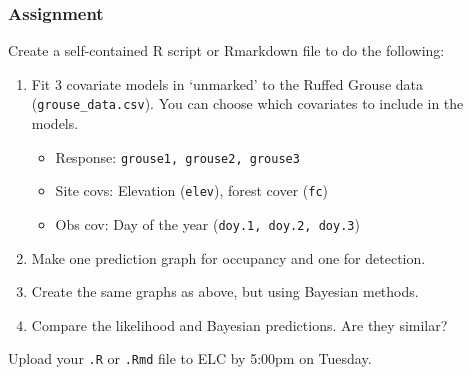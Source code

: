 \documentclass[color=usenames,dvipsnames]{beamer}\usepackage[]{graphicx}\usepackage[]{xcolor}
\begin{document}
\begin{frame}
  \frametitle{Assignment}
  \footnotesize
  Create a self-contained R script or Rmarkdown file
  to do the following:
  \vfill
  \begin{enumerate}
    \footnotesize
    \item Fit 3 covariate models in `unmarked' to the Ruffed Grouse
      data ({\tt grouse\_data.csv}). You can choose which covariates
      to include in the models.  
      \begin{itemize}
        \footnotesize
        \item Response: \texttt{grouse1, grouse2, grouse3}
        \item Site covs: Elevation (\texttt{elev}), forest cover ({\tt fc})
        \item Obs cov: Day of the year (\texttt{doy.1, doy.2, doy.3})
      \end{itemize}
    \item Make one prediction graph for occupancy and one for
      detection.  
    \item Create the same graphs as above, but using Bayesian methods.
    \item Compare the likelihood and Bayesian predictions. Are they
      similar?   
    \end{enumerate}
    \vfill
    Upload your {\tt .R} or {\tt .Rmd} file to ELC by 5:00pm on Tuesday. 
\end{frame}
\end{document}
